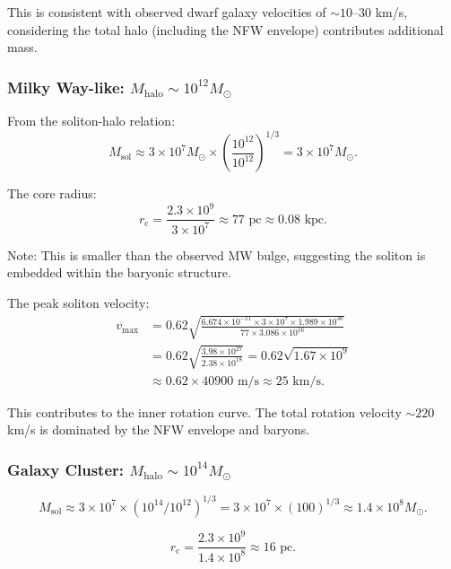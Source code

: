 \documentclass[11pt,a4paper]{article}
\newcommand{\ee}[1]{\times 10^{#1}}
\newcommand{\Msun}{\ensuremath{M_{\odot}}}
\newcommand{\Msol}{\ensuremath{M_{\mathrm{sol}}}}
\newcommand{\Mhalo}{\ensuremath{M_{\mathrm{halo}}}}
\newcommand{\rc}{\ensuremath{r_{\mathrm{c}}}}
\theoremstyle{definition}
\theoremstyle{remark}
\begin{document}
This is consistent with observed dwarf galaxy velocities of $\sim 10$--$30$ km/s, considering the total halo (including the NFW envelope) contributes additional mass.

\subsubsection{Milky Way-like: $\Mhalo \sim 10^{12} \Msun$}

From the soliton-halo relation:
\begin{equation}
\Msol \approx 3 \times 10^{7} \Msun \times \left(\frac{10^{12}}{10^{12}}\right)^{1/3} = 3 \times 10^7 \Msun.
\end{equation}

The core radius:
\begin{equation}
\rc = \frac{2.3 \times 10^9}{3 \times 10^7} \approx 77 \text{ pc} \approx 0.08 \text{ kpc}.
\end{equation}

Note: This is smaller than the observed MW bulge, suggesting the soliton is embedded within the baryonic structure.

The peak soliton velocity:
\begin{align}
v_{\max} &= 0.62 \sqrt{\frac{6.674 \ee{-11} \times 3 \ee{7} \times 1.989 \ee{30}}{77 \times 3.086 \ee{16}}} \nonumber \\
&= 0.62 \sqrt{\frac{3.98 \ee{27}}{2.38 \ee{18}}} = 0.62 \sqrt{1.67 \ee{9}} \nonumber \\
&\approx 0.62 \times 40900 \text{ m/s} \approx 25 \text{ km/s}.
\end{align}

This contributes to the inner rotation curve. The total rotation velocity $\sim 220$ km/s is dominated by the NFW envelope and baryons.

\subsubsection{Galaxy Cluster: $\Mhalo \sim 10^{14} \Msun$}

\begin{equation}
\Msol \approx 3 \times 10^7 \times (10^{14}/10^{12})^{1/3} = 3 \times 10^7 \times (100)^{1/3} \approx 1.4 \times 10^8 \Msun.
\end{equation}

\begin{equation}
\rc = \frac{2.3 \times 10^9}{1.4 \times 10^8} \approx 16 \text{ pc}.
\end{equation}
\end{document}
